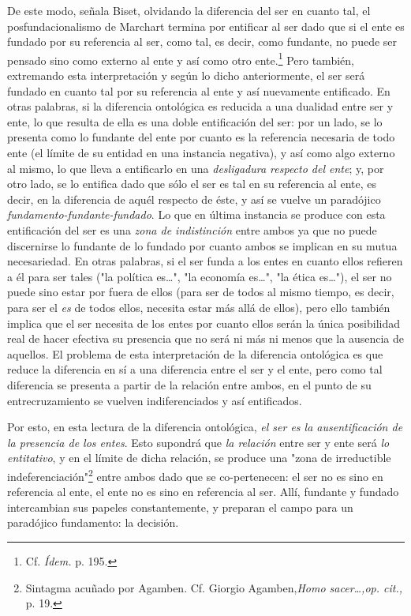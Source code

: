 \documentclass{book}
\begin{document}
De este modo, señala Biset, olvidando la diferencia del ser en cuanto
tal, el posfundacionalismo de Marchart termina por entificar al ser dado
que si el ente es fundado por su referencia al ser, como tal, es decir,
como fundante, no puede ser pensado sino como externo al ente y así como
otro ente.\footnote{Cf. \emph{Ídem.} p. 195.} Pero también, extremando
esta interpretación y según lo dicho anteriormente, el ser será fundado
en cuanto tal por su referencia al ente y así nuevamente entificado. En
otras palabras, si la diferencia ontológica es reducida a una dualidad
entre ser y ente, lo que resulta de ella es una doble entificación del
ser: por un lado, se lo presenta como lo fundante del ente por cuanto es
la referencia necesaria de todo ente (el límite de su entidad en una
instancia negativa), y así como algo externo al mismo, lo que lleva a
entificarlo en una \emph{desligadura respecto del ente}; y, por otro
lado, se lo entifica dado que sólo el ser es tal en su referencia al
ente, es decir, en la diferencia de aquél respecto de éste, y así se
vuelve un paradójico \emph{fundamento-fundante-fundado}. Lo que en
última instancia se produce con esta entificación del ser es una
\emph{zona de indistinción} entre ambos ya que no puede discernirse lo
fundante de lo fundado por cuanto ambos se implican en su mutua
necesariedad. En otras palabras, si el ser funda a los entes en cuanto
ellos refieren a él para ser tales ("la política es\ldots", "la economía
es\ldots", "la ética es\ldots"), el ser no puede sino estar por fuera de
ellos (para ser de todos al mismo tiempo, es decir, para ser el
\emph{es} de todos ellos, necesita estar más allá de ellos), pero ello
también implica que el ser necesita de los entes por cuanto ellos serán
la única posibilidad real de hacer efectiva su presencia que no será ni
más ni menos que la ausencia de aquellos. El problema de esta
interpretación de la diferencia ontológica es que reduce la diferencia
en sí a una diferencia entre el ser y el ente, pero como tal diferencia
se presenta a partir de la relación entre ambos, en el punto de su
entrecruzamiento se vuelven indiferenciados y así entificados.

Por esto, en esta lectura de la diferencia ontológica, \emph{el ser es
la ausentificación de la presencia de los entes}. Esto supondrá que
\emph{la relación} entre ser y ente será \emph{lo entitativo}, y en el
límite de dicha relación, se produce una "zona de irreductible
indeferenciación"\footnote{Sintagma acuñado por Agamben. Cf. Giorgio
  Agamben,\emph{Homo sacer\ldots,op. cit.,} p. 19.} entre ambos dado que
se co-pertenecen: el ser no es sino en referencia al ente, el ente no es
sino en referencia al ser. Allí, fundante y fundado intercambian sus
papeles constantemente, y preparan el campo para un paradójico
fundamento: la decisión.
\end{document}
